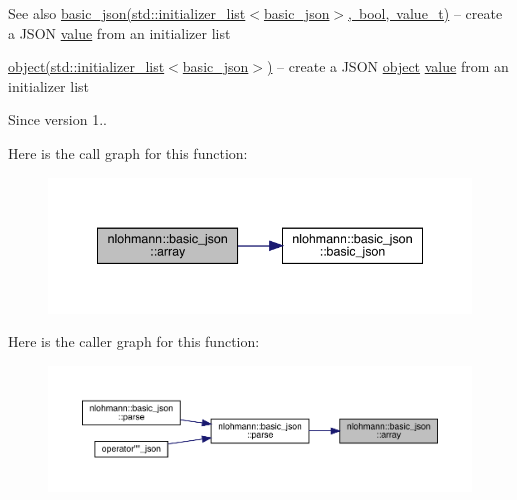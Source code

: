 \begin{DoxySeeAlso}{See also}
\mbox{\hyperlink{classnlohmann_1_1basic__json_afbad48316e7cd37366ba3ac5d7e5859e}{basic\+\_\+json(std\+::initializer\+\_\+list$<$basic\+\_\+json$>$, bool, value\+\_\+t)}} -- create a J\+S\+ON \mbox{\hyperlink{classnlohmann_1_1basic__json_af9c51328fbe1da75eca750be3009917a}{value}} from an initializer list 

\mbox{\hyperlink{classnlohmann_1_1basic__json_a9f42ee7d10eee2d5a73fd94ca7f767ca}{object(std\+::initializer\+\_\+list$<$basic\+\_\+json$>$)}} -- create a J\+S\+ON \mbox{\hyperlink{classnlohmann_1_1basic__json_a9f42ee7d10eee2d5a73fd94ca7f767ca}{object}} \mbox{\hyperlink{classnlohmann_1_1basic__json_af9c51328fbe1da75eca750be3009917a}{value}} from an initializer list
\end{DoxySeeAlso}
\begin{DoxySince}{Since}
version 1.. 
\end{DoxySince}
Here is the call graph for this function\+:
\nopagebreak
\begin{figure}[H]
\begin{center}
\leavevmode
\includegraphics[width=341pt]{classnlohmann_1_1basic__json_a4a4ec75e4d2845d9bcf7a9e5458e4949_cgraph}
\end{center}
\end{figure}
Here is the caller graph for this function\+:
\nopagebreak
\begin{figure}[H]
\begin{center}
\leavevmode
\includegraphics[width=350pt]{classnlohmann_1_1basic__json_a4a4ec75e4d2845d9bcf7a9e5458e4949_icgraph}
\end{center}
\end{figure}
\mbox{\label{classnlohmann_1_1basic__json_a73ae333487310e3302135189ce8ff5d8}} 
